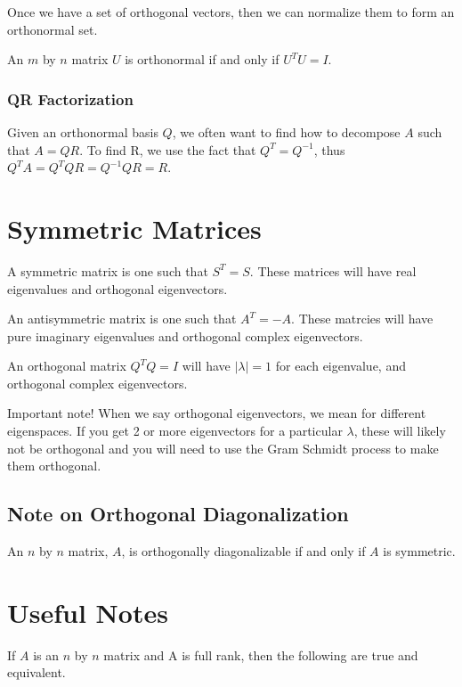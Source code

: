 \documentclass[12pt,landscape,a4paper]{article}
\begin{document}
\begin{multicols*}{3}
  Once we have a set of orthogonal vectors, then we can normalize them to form an
  orthonormal set.

  An $m$ by $n$ matrix $U$ is orthonormal if and only if $U^TU = I$.
  
  \subsubsection{QR Factorization}
  Given an orthonormal basis $Q$, we often want to find how to decompose $A$
  such that $A = QR$. To find R, we use the fact that $Q^T = Q^{-1}$, thus $Q^TA
  = Q^TQR = Q^{-1}QR = R$. 


  \section{Symmetric Matrices}
  A symmetric matrix is one such that $S^T = S$. These matrices will have real
  eigenvalues and orthogonal eigenvectors.

  An antisymmetric matrix is one such that $A^T = -A$. These matrcies will have
  pure imaginary eigenvalues and orthogonal complex eigenvectors.

  An orthogonal matrix $Q^TQ = I$ will have $|\lambda| = 1$ for each eigenvalue,
  and orthogonal complex eigenvectors.

  Important note! When we say orthogonal eigenvectors, we mean for different
  eigenspaces. If you get 2 or more eigenvectors for a particular $\lambda$,
  these will likely not be orthogonal and you will need to use the Gram Schmidt
  process to make them orthogonal.

  \subsection{Note on Orthogonal Diagonalization}

  An $n$ by $n$ matrix, $A$, is orthogonally diagonalizable if and only if $A$
  is symmetric.

  \section{Useful Notes}
  If $A$ is an $n$ by $n$ matrix and A is full rank, then the following are true
  and equivalent.


\end{multicols*}
\end{document}
